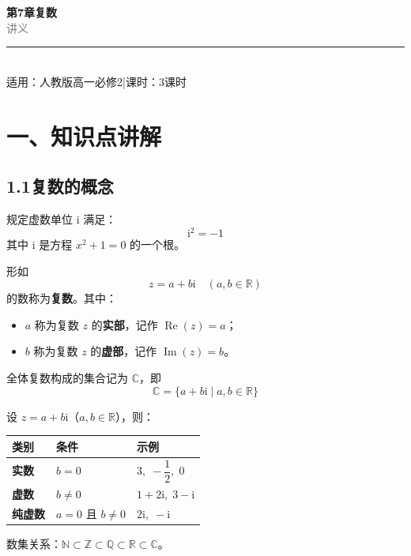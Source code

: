 \documentclass[12pt, a4paper]{ctexart}
\begin{document}
\begin{center}
{\Huge\bfseries\textcolor{mainblue}{第7章\quad 复数}}\\[12pt]
{\Large\textcolor{gray}{讲\quad 义}}\\[8pt]
\rule{0.6\textwidth}{1pt}\\[8pt]
{\normalsize 适用：人教版\quad 高一必修2\quad |\quad 课时：3课时}
\end{center}
\vspace{10pt}

\section*{\textcolor{mainblue}{一、知识点讲解}}

\subsection*{1.1\quad 复数的概念}

\begin{knowledgebox}[虚数单位]
规定虚数单位 $\mathrm{i}$ 满足：
\[
  \mathrm{i}^2 = -1
\]
其中 $\mathrm{i}$ 是方程 $x^2 + 1 = 0$ 的一个根。
\end{knowledgebox}

\begin{knowledgebox}[复数的定义]
形如
\[
  z = a + b\mathrm{i} \quad (a, b \in \mathbb{R})
\]
的数称为\textbf{复数}。其中：
\begin{itemize}[leftmargin=2em]
  \item $a$ 称为复数 $z$ 的\textbf{实部}，记作 $\operatorname{Re}(z) = a$；
  \item $b$ 称为复数 $z$ 的\textbf{虚部}，记作 $\operatorname{Im}(z) = b$。
\end{itemize}
全体复数构成的集合记为 $\mathbb{C}$，即
\[
\mathbb{C} = \{a + b\mathrm{i} \mid a, b \in \mathbb{R}\}
\]
\end{knowledgebox}

\begin{knowledgebox}[复数的分类]
设 $z = a + b\mathrm{i}$（$a, b \in \mathbb{R}$），则：
\begin{center}
\begin{tabular}{lll}
\toprule
\textbf{类别} & \textbf{条件} & \textbf{示例} \\
\midrule
\textbf{实数}      & $b = 0$              & $3,\; -\dfrac{1}{2},\; 0$ \\[6pt]
\textbf{虚数}      & $b \neq 0$           & $1+2\mathrm{i},\; 3-\mathrm{i}$ \\[6pt]
\textbf{纯虚数}    & $a = 0$ 且 $b \neq 0$ & $2\mathrm{i},\; -\mathrm{i}$ \\
\bottomrule
\end{tabular}
\end{center}
数集关系：$\mathbb{N} \subset \mathbb{Z} \subset \mathbb{Q} \subset \mathbb{R} \subset \mathbb{C}$。
\end{knowledgebox}
\end{document}
